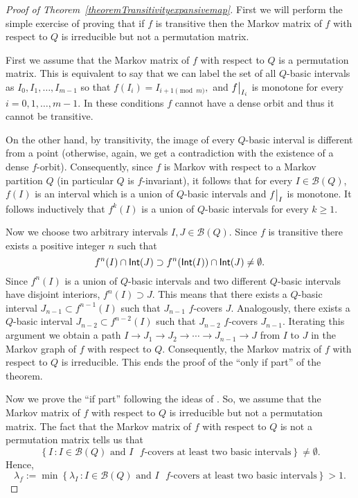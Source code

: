 \documentclass[a4paper, 11pt]{amsart}
\numberwithin{equation}{section}
\theoremstyle{customnumberedtheorem}
\theoremstyle{definitionwithbfnote}
\DeclareMathOperator{\Int}{\textsf{\upshape Int}}
\newcommand{\set}[2]{\ensuremath{\left\{#1 \,\colon #2\right\}}}
\def\calB{\mathcal{B}}
\newcommand{\SBI}[1][Q]{\ensuremath{\calB(#1)}}
\newcommand{\evalat}[1]{\bigr\rvert\sb{#1}}
\begin{document}
\begin{proof}[Proof of Theorem~\ref{theoremTransitivityexpansivemap}]
First we will perform the simple exercise of proving that
if $f$ is transitive then
the Markov matrix of $f$ with respect to $Q$ is irreducible but not a permutation matrix.

First we assume that the Markov matrix of $f$ with respect to $Q$ is a permutation matrix.
This is equivalent to say that
we can label the set of all $Q$-basic intervals as
$I_0, I_1, \dots, I_{m-1}$ so that $f(I_i) = I_{i+1 \pmod{m}},$
and $f\evalat{I_i}$ is monotone for every $i = 0,1,\dots, m-1$.
In these conditions $f$ cannot have a dense orbit and thus it cannot be transitive.

On the other hand, by transitivity,
the image of every $Q$-basic interval is different from a point
(otherwise, again, we get a contradiction with the existence of a dense $f$-orbit).
Consequently, since $f$ is Markov with respect to a
Markov partition $Q$ (in particular $Q$ is $f$-invariant),
it follows that for every $I \in \SBI$,
$f(I)$ is an interval which is a union of $Q$-basic intervals and $f\evalat{I}$ is monotone.
It follows inductively that $f^k(I)$ is a union of $Q$-basic intervals for every $k \ge 1$.

Now we choose two arbitrary intervals $I, J \in \SBI$.
Since $f$ is transitive there exists a positive integer $n$ such that
\[ f^n(I) \cap \Int(J) \supset f^n(\Int(I)) \cap \Int(J) \ne \emptyset. \]
Since $f^n(I)$ is a union of $Q$-basic intervals and two different $Q$-basic intervals
have disjoint interiors, $f^n(I) \supset J.$ This means that there exists a
$Q$-basic interval $J_{n-1} \subset f^{n-1}(I)$ such that $J_{n-1}$ $f$-covers $J$.
Analogously, there exists a $Q$-basic interval $J_{n-2} \subset f^{n-2}(I)$ such that $J_{n-2}$ $f$-covers $J_{n-1}$.
Iterating this argument we obtain a path
$I \longrightarrow J_1 \longrightarrow J_2 \longrightarrow \cdots \longrightarrow J_{n-1} \longrightarrow J$
from $I$ to $J$ in the Markov graph of $f$ with respect to $Q$.
Consequently, the Markov matrix of $f$ with respect to $Q$ is irreducible.
This ends the proof of the ``only if part'' of the theorem.

Now we prove the ``if part'' following the ideas of \cite{bc}.
So, we assume that the Markov  matrix of $f$ with respect to $Q$
is irreducible but not a permutation matrix.
The fact that the Markov  matrix of $f$ with respect to $Q$
is not a permutation matrix tells us that
\[
\set{I}{I\in \SBI\text{ and $I$ $f$-covers at least two basic intervals}} \ne \emptyset.
\]
Hence,
\[
\lambda_f := \min \set{\lambda_I}{I\in \SBI\text{ and $I$ $f$-covers at least two basic intervals}} > 1.
\]


\end{proof}
\end{document}
